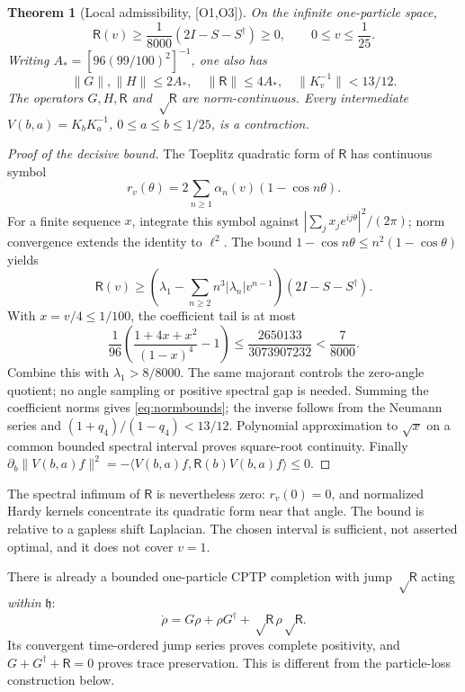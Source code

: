 \documentclass[11pt,letterpaper]{article}
\numberwithin{equation}{section}
\newtheorem{theorem}{Theorem}[section]
\theoremstyle{remark}
\newcommand{\ip}[2]{\langle #1,#2\rangle}
\newcommand{\loss}{\mathsf R}
\newcommand{\ev}[1]{\textsf{[#1]}}
\begin{document}
\begin{theorem}[Local admissibility, \ev{O1,O3}]
On the infinite one-particle space,
\begin{equation}
 \loss(v)\ge\frac1{8000}(2I-S-S^\dagger)\ge0,
 \qquad 0\le v\le\frac1{25}. \label{eq:lossbound}
\end{equation}
Writing $A_*=[96(99/100)^2]^{-1}$, one also has
\begin{equation}
 \|G\|,\|H\|\le2A_*,\quad \|\loss\|\le4A_*,\quad
 \|K_v^{-1}\|<13/12. \label{eq:normbounds}
\end{equation}
The operators $G,H,\loss$ and $\sqrt\loss$ are norm-continuous. Every
intermediate $V(b,a)=K_bK_a^{-1}$, $0\le a\le b\le1/25$, is a contraction.
\end{theorem}
\begin{proof}[Proof of the decisive bound]
The Toeplitz quadratic form of $\loss$ has continuous symbol
\[
 r_v(\theta)=2\sum_{n\ge1}\alpha_n(v)(1-\cos n\theta).
\]
For a finite sequence $x$, integrate this symbol against
$|\sum_jx_je^{ij\theta}|^2/(2\pi)$; norm convergence extends the identity
to $\ell^2$. The bound
$1-\cos n\theta\le n^2(1-\cos\theta)$ yields
\[
 \loss(v)\ge\left(\lambda_1-\sum_{n\ge2}n^3|\lambda_n|v^{n-1}\right)
 (2I-S-S^\dagger).
\]
With $x=v/4\le1/100$, the coefficient tail is at most
\[
 \frac1{96}\left(\frac{1+4x+x^2}{(1-x)^4}-1\right)
 \le\frac{2650133}{3073907232}<\frac7{8000}.
\]
Combine this with $\lambda_1>8/8000$. The same majorant controls the
zero-angle quotient; no angle sampling or positive spectral gap is
needed. Summing the coefficient norms gives \eqref{eq:normbounds};
the inverse follows from the Neumann series and
$(1+q_4)/(1-q_4)<13/12$. Polynomial approximation to $\sqrt{x}$ on a
common bounded spectral interval proves square-root continuity.
Finally
$\partial_b\|V(b,a)f\|^2=-\ip{V(b,a)f}{\loss(b)V(b,a)f}\le0$.
\end{proof}

The spectral infimum of $\loss$ is nevertheless zero: $r_v(0)=0$,
and normalized Hardy kernels concentrate its quadratic form near that
angle. The bound is relative to a gapless shift Laplacian. The chosen
interval is sufficient, not asserted optimal, and it does not cover
$v=1$.

There is already a bounded one-particle CPTP completion with jump
$\sqrt\loss$ acting \emph{within} $\mathfrak h$:
\[
 \dot\rho=G\rho+\rho G^\dagger+\sqrt\loss\,\rho\sqrt\loss.
\]
Its convergent time-ordered jump series proves complete positivity,
and $G+G^\dagger+\loss=0$ proves trace preservation. This is different
from the particle-loss construction below.
\end{document}
